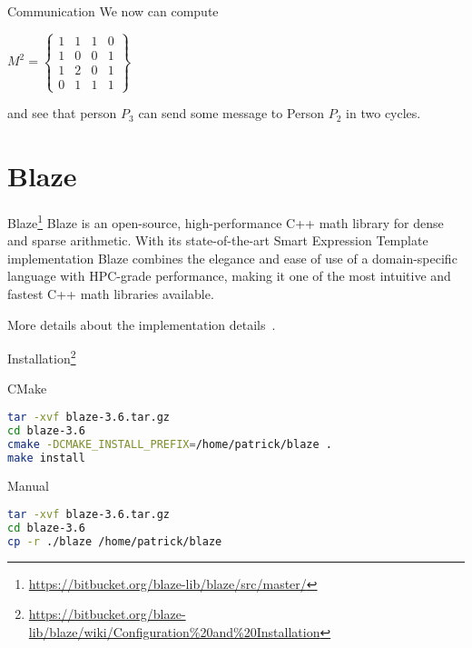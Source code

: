 \documentclass[\classoption]{beamer}
\begin{document}
\begin{frame}{Communication}
We now can compute 

\begin{center}
$
M^2 = \left\lbrace\begin{matrix}
1 &  1 & 1 &  0 \\
1 & 0 & 0  & 1 \\
1 & 2 & 0 & 1 \\
0 & 1 & 1 & 1
\end{matrix} \right\rbrace
$
\end{center}
and see that person $P_3$ can send some message to Person $P_2$ in two cycles. 


\end{frame}


\section{Blaze}

\begin{frame}{Blaze\footnote{\tiny\url{https://bitbucket.org/blaze-lib/blaze/src/master/}}}
Blaze is an open-source, high-performance C++ math library for dense and sparse arithmetic. With its state-of-the-art Smart Expression Template implementation Blaze combines the elegance and ease of use of a domain-specific language with HPC-grade performance, making it one of the most intuitive and fastest C++ math libraries available.
\vspace{1cm}

More details about the implementation details~\cite{doi:10.1137/110830125,6266939}.
\end{frame}



\begin{frame}[fragile]{Installation\footnote{\tiny\url{https://bitbucket.org/blaze-lib/blaze/wiki/Configuration\%20and\%20Installation}}}


\begin{block}{CMake}
\begin{lstlisting}[language=bash]
tar -xvf blaze-3.6.tar.gz
cd blaze-3.6
cmake -DCMAKE_INSTALL_PREFIX=/home/patrick/blaze .
make install
\end{lstlisting}
\end{block}

\begin{block}{Manual}
\begin{lstlisting}[language=bash]
tar -xvf blaze-3.6.tar.gz
cd blaze-3.6
cp -r ./blaze /home/patrick/blaze
\end{lstlisting}
\end{block}


\end{frame}
\end{document}
